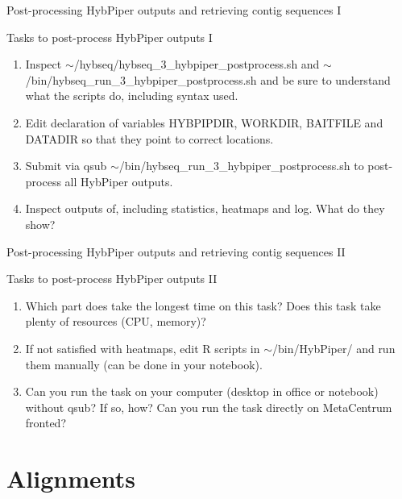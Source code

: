 \documentclass[compress, ucs, xelatex, 11pt, xcolor=x11names, aspectratio=169,
	hyperref={
		bookmarks=true,
		unicode=true,
		colorlinks=true,
		pdftitle={HybSeq course},
		plainpages=false,
		pdfauthor={Vojtech Zeisek},
		pdfsubject={Practical processing of HybSeq target enrichment sequencing data on computing grids like MetaCentrum},
		pdfcreator={XeLaTeX},
		pdfkeywords={BASH, command line, GNU, HybSeq, Linux, MetaCentrum, sequencing shell, target enrichment},
		linkcolor=Turquoise4, %
		anchorcolor=DodgerBlue4, %
		citecolor=DodgerBlue4, %
		filecolor=DodgerBlue4, %
		menucolor=Tan4, %
		urlcolor=DarkOliveGreen4, %
		pdftex},
	url={hyphens, lowtilde} %
	]{beamer}
\renewcommand{\texttt}[1]{\colorbox{Cornsilk2}{{\ttfamily #1}}}
\begin{document}
\begin{frame}{Post-processing HybPiper outputs and retrieving contig sequences I}
	\begin{exampleblock}{Tasks to post-process HybPiper outputs I}
		\begin{enumerate}
			\item Inspect \texttt{$\sim$/hybseq/hybseq\_3\_hybpiper\_postprocess.sh} and \texttt{$\sim$/bin/hybseq\_run\_3\_hybpiper\_postprocess.sh} and be sure to understand what the scripts do, including syntax used.
			\item Edit declaration of variables \texttt{HYBPIPDIR}, \texttt{WORKDIR}, \texttt{BAITFILE} and \texttt{DATADIR} so that they point to correct locations.
			\item Submit via \texttt{qsub} \texttt{$\sim$/bin/hybseq\_run\_3\_hybpiper\_postprocess.sh} to post-process all HybPiper outputs.
			\item Inspect outputs of, including statistics, heatmaps and log. What do they show?
		\end{enumerate}
	\end{exampleblock}
\end{frame}

\begin{frame}{Post-processing HybPiper outputs and retrieving contig sequences II}
	\begin{exampleblock}{Tasks to post-process HybPiper outputs II}
		\begin{enumerate}
			\item Which part does take the longest time on this task? Does this task take plenty of resources (CPU, memory)?
			\item If not satisfied with heatmaps, edit \texttt{R} scripts in \texttt{$\sim$/bin/HybPiper/} and run them manually (can be done in your notebook).
			\item Can you run the task on your computer (desktop in office or notebook) without \texttt{qsub}? If so, how? Can you run the task directly on MetaCentrum fronted?
		\end{enumerate}
	\end{exampleblock}
\end{frame}

\section{Alignments}
\end{document}
